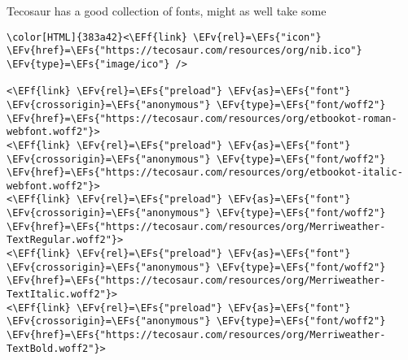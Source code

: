 \documentclass{scrartcl}
\newcommand{\EFs}[1]{\textcolor{EFs}{#1}} %
\newcommand{\EFv}[1]{\textcolor{EFv}{#1}} %
\newcommand{\EFf}[1]{\textcolor{EFf}{#1}} %
\begin{document}
Tecosaur has a good collection of fonts, might as well take some
\begin{Code}
\begin{Verbatim}[]
\color[HTML]{383a42}<\EFf{link} \EFv{rel}=\EFs{"icon"} \EFv{href}=\EFs{"https://tecosaur.com/resources/org/nib.ico"} \EFv{type}=\EFs{"image/ico"} />

<\EFf{link} \EFv{rel}=\EFs{"preload"} \EFv{as}=\EFs{"font"} \EFv{crossorigin}=\EFs{"anonymous"} \EFv{type}=\EFs{"font/woff2"} \EFv{href}=\EFs{"https://tecosaur.com/resources/org/etbookot-roman-webfont.woff2"}>
<\EFf{link} \EFv{rel}=\EFs{"preload"} \EFv{as}=\EFs{"font"} \EFv{crossorigin}=\EFs{"anonymous"} \EFv{type}=\EFs{"font/woff2"} \EFv{href}=\EFs{"https://tecosaur.com/resources/org/etbookot-italic-webfont.woff2"}>
<\EFf{link} \EFv{rel}=\EFs{"preload"} \EFv{as}=\EFs{"font"} \EFv{crossorigin}=\EFs{"anonymous"} \EFv{type}=\EFs{"font/woff2"} \EFv{href}=\EFs{"https://tecosaur.com/resources/org/Merriweather-TextRegular.woff2"}>
<\EFf{link} \EFv{rel}=\EFs{"preload"} \EFv{as}=\EFs{"font"} \EFv{crossorigin}=\EFs{"anonymous"} \EFv{type}=\EFs{"font/woff2"} \EFv{href}=\EFs{"https://tecosaur.com/resources/org/Merriweather-TextItalic.woff2"}>
<\EFf{link} \EFv{rel}=\EFs{"preload"} \EFv{as}=\EFs{"font"} \EFv{crossorigin}=\EFs{"anonymous"} \EFv{type}=\EFs{"font/woff2"} \EFv{href}=\EFs{"https://tecosaur.com/resources/org/Merriweather-TextBold.woff2"}>
\end{Verbatim}
\end{Code}
\end{document}
